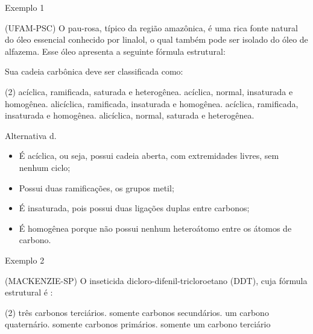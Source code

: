 \documentclass[presentation,professionalfonts,aspectratio=169]{beamer}
\begin{document}
\begin{frame}[label={sec:org2ffa1a0}]{Exemplo 1}
\begin{question}
\small
(\alert{UFAM-PSC}) O pau-rosa, típico da região amazônica, é uma rica fonte natural do óleo essencial conhecido por linalol, o qual também pode ser isolado do óleo de alfazema. Esse óleo apresenta a seguinte fórmula estrutural:

Sua cadeia carbônica deve ser classificada como:

\begin{choice}(2)
\choice acíclica, ramificada, saturada e heterogênea.
\choice acíclica, normal, insaturada e homogênea.
\choice alicíclica, ramificada, insaturada e homogênea.
\choice acíclica, ramificada, insaturada e homogênea.
\choice alicíclica, normal, saturada e heterogênea.
\end{choice}
\end{question}
\end{frame}
\begin{frame}[label={sec:org455e814}]{}
\begin{answer}[print=true]
Alternativa \alert{d}.

\begin{itemize}
\item É acíclica, ou seja, possui cadeia aberta, com extremidades livres, sem nenhum ciclo;
\item Possui duas ramificações, os grupos metil;
\item É insaturada, pois possui duas ligações duplas entre carbonos;
\item É homogênea porque não possui nenhum heteroátomo entre os átomos de carbono.
\end{itemize}
\end{answer}
\end{frame}
\begin{frame}[label={sec:org0984681}]{Exemplo 2}
\begin{question}
\alert{(MACKENZIE-SP)} O inseticida dicloro-difenil-tricloroetano (DDT), cuja fórmula estrutural é :



\begin{choice}(2)
\choice três carbonos terciários.
\choice somente carbonos secundários.
\choice um carbono quaternário.
\choice somente carbonos primários.
\choice somente um carbono terciário
\end{choice}
\end{question}
\end{frame}
\end{document}
